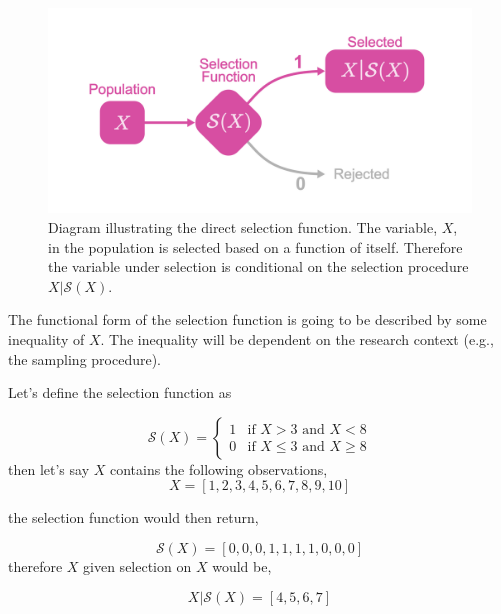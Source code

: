 \documentclass[
  letterpaper,
  DIV=11,
  numbers=noendperiod]{scrreprt}
\begin{document}
\begin{figure}[H]

{\centering \includegraphics{figure/direct_select_diagram.png}

}

\caption{\label{fig-direct-select-diag}Diagram illustrating the direct
selection function. The variable, \(X\), in the population is selected
based on a function of itself. Therefore the variable under selection is
conditional on the selection procedure \(X|\mathcal{S}(X)\).}

\end{figure}

The functional form of the selection function is going to be described
by some inequality of \(X\). The inequality will be dependent on the
research context (e.g., the sampling procedure).

\begin{tcolorbox}[enhanced jigsaw, toptitle=1mm, titlerule=0mm, arc=.35mm, breakable, colframe=quarto-callout-tip-color-frame, title={A Simple Example}, opacitybacktitle=0.6, opacityback=0, colbacktitle=quarto-callout-tip-color!10!white, coltitle=black, bottomtitle=1mm, colback=white, bottomrule=.15mm, rightrule=.15mm, toprule=.15mm, leftrule=.75mm, left=2mm]

Let's define the selection function as

\[\mathcal{S}(X) = \begin{cases}1 & \text{if }X>3 \text{ and } X<8 \\ 0 & \text{if }X\leq3 \text{ and } X\geq8  \end{cases}\]
then let's say \(X\) contains the following observations, \[
X = [1,2,3,4,5,6,7,8,9,10]
\]

the selection function would then return,

\[
\mathcal{S}(X) =  [0,0,0,1,1,1,1,0,0,0]
\] therefore \(X\) given selection on \(X\) would be,

\[
X|\mathcal{S}(X) =  [4,5,6,7]
\]

\end{tcolorbox}
\end{document}
